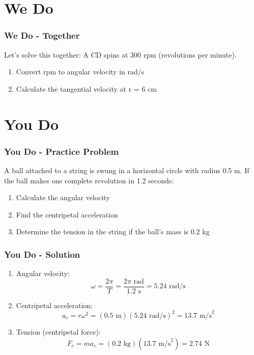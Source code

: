 \documentclass{beamer}
\begin{document}
\section{We Do}

\begin{frame}
\frametitle{We Do - Together}
Let's solve this together: A CD spins at 300 rpm (revolutions per minute).
\begin{enumerate}
    \item Convert rpm to angular velocity in rad/s
    \item Calculate the tangential velocity at r = 6 cm
\end{enumerate}


\end{frame}

\section{You Do}

\begin{frame}
\frametitle{You Do - Practice Problem}
A ball attached to a string is swung in a horizontal circle with radius 0.5 m. If the ball makes one complete revolution in 1.2 seconds:
\begin{enumerate}
    \item Calculate the angular velocity
    \item Find the centripetal acceleration
    \item Determine the tension in the string if the ball's mass is 0.2 kg
\end{enumerate}
\end{frame}

\begin{frame}
\frametitle{You Do - Solution}
\begin{enumerate}
    \item Angular velocity:
    \[ \omega = \frac{2\pi}{T} = \frac{2\pi\text{ rad}}{1.2\text{ s}} = 5.24\text{ rad/s} \]
    
    \item Centripetal acceleration:
    \[ a_c = r\omega^2 = (0.5\text{ m})(5.24\text{ rad/s})^2 = 13.7\text{ m/s}^2 \]
    
    \item Tension (centripetal force):
    \[ F_c = ma_c = (0.2\text{ kg})(13.7\text{ m/s}^2) = 2.74\text{ N} \]
\end{enumerate}
\end{frame}
\end{document}
